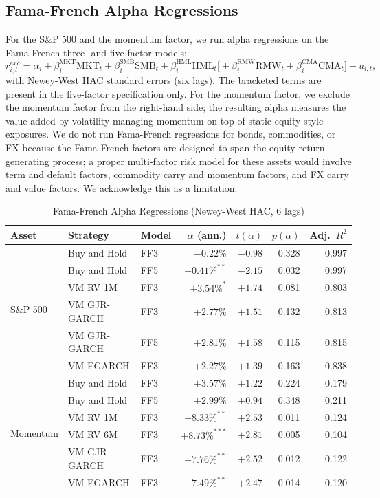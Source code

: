 \documentclass[12pt, a4paper]{article}
\begin{document}
\subsection{Fama-French Alpha Regressions}

For the S\&P 500 and the momentum factor, we run alpha regressions on the Fama-French
three- and five-factor models:
\begin{equation}
r^{exc}_{i,t} = \alpha_i + \beta^{\mathrm{MKT}}_i \mathrm{MKT}_t + \beta^{\mathrm{SMB}}_i \mathrm{SMB}_t
+ \beta^{\mathrm{HML}}_i \mathrm{HML}_t \bigl[+ \beta^{\mathrm{RMW}}_i \mathrm{RMW}_t + \beta^{\mathrm{CMA}}_i \mathrm{CMA}_t\bigr] + u_{i,t},
\end{equation}
with Newey-West HAC standard errors (six lags). The bracketed terms are present in the
five-factor specification only. For the momentum factor, we exclude the momentum factor
from the right-hand side; the resulting alpha measures the value added by volatility-managing
momentum on top of static equity-style exposures. We do not run Fama-French regressions
for bonds, commodities, or FX because the Fama-French factors are designed to span the
equity-return generating process; a proper multi-factor risk model for these assets would
involve term and default factors, commodity carry and momentum factors, and FX carry and
value factors. We acknowledge this as a limitation.

\begin{table}[H]
\centering
\footnotesize
\caption{Fama-French Alpha Regressions (Newey-West HAC, 6 lags)}
\label{tab:ff}
\begin{tabular}{lllrrrr}
\toprule
\textbf{Asset} & \textbf{Strategy} & \textbf{Model} & $\alpha$ \textbf{(ann.)} & $t(\alpha)$ & $p(\alpha)$ & \textbf{Adj.\ }$R^2$\\
\midrule
\multirow{6}{*}{S\&P 500}
& Buy and Hold   & FF3 & $-0.22\%$       & $-0.98$ & 0.328 & 0.997\\
& Buy and Hold   & FF5 & $-0.41\%^{**}$  & $-2.15$ & 0.032 & 0.997\\
& VM RV 1M       & FF3 & $+3.54\%^{*}$   & $+1.74$ & 0.081 & 0.803\\
& VM GJR-GARCH   & FF3 & $+2.77\%$       & $+1.51$ & 0.132 & 0.813\\
& VM GJR-GARCH   & FF5 & $+2.81\%$       & $+1.58$ & 0.115 & 0.815\\
& VM EGARCH      & FF3 & $+2.27\%$       & $+1.39$ & 0.163 & 0.838\\
\midrule
\multirow{6}{*}{Momentum}
& Buy and Hold   & FF3 & $+3.57\%$       & $+1.22$ & 0.224 & 0.179\\
& Buy and Hold   & FF5 & $+2.99\%$       & $+0.94$ & 0.348 & 0.211\\
& VM RV 1M       & FF3 & $+8.33\%^{**}$  & $+2.53$ & 0.011 & 0.124\\
& VM RV 6M       & FF3 & $+8.73\%^{***}$ & $+2.81$ & 0.005 & 0.104\\
& VM GJR-GARCH   & FF3 & $+7.76\%^{**}$  & $+2.52$ & 0.012 & 0.122\\
& VM EGARCH      & FF3 & $+7.49\%^{**}$  & $+2.47$ & 0.014 & 0.120\\
\bottomrule
\end{tabular}
\end{table}
\end{document}

